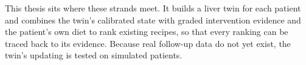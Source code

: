 This thesis sits where these strands meet. It builds a liver twin for each patient and combines the twin's calibrated state with graded intervention evidence and the patient's own diet to rank existing recipes, so that every ranking can be traced back to its evidence. Because real follow-up data do not yet exist, the twin's updating is tested on simulated patients.